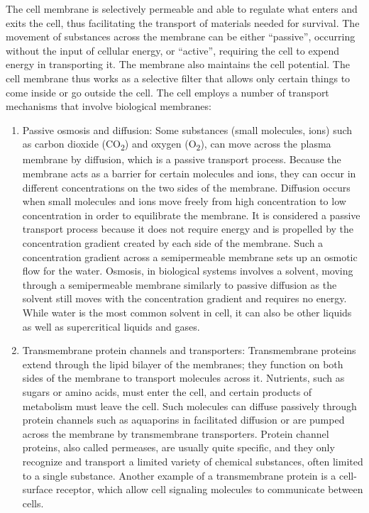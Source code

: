The cell membrane is selectively permeable and able to regulate what enters and exits the cell, thus facilitating the transport of materials needed for survival. The movement of substances across the membrane can be either ``passive'', occurring without the input of cellular energy, or ``active'', requiring the cell to expend energy in transporting it. The membrane also maintains the cell potential. The cell membrane thus works as a selective filter that allows only certain things to come inside or go outside the cell. The cell employs a number of transport mechanisms that involve biological membranes:

\begin{enumerate}
\def\labelenumi{\arabic{enumi}.}
\item
  Passive osmosis and diffusion: Some substances (small molecules, ions) such as carbon dioxide (CO\textsubscript{2}) and oxygen (O\textsubscript{2}), can move across the plasma membrane by diffusion, which is a passive transport process. Because the membrane acts as a barrier for certain molecules and ions, they can occur in different concentrations on the two sides of the membrane. Diffusion occurs when small molecules and ions move freely from high concentration to low concentration in order to equilibrate the membrane. It is considered a passive transport process because it does not require energy and is propelled by the concentration gradient created by each side of the membrane. Such a concentration gradient across a semipermeable membrane sets up an osmotic flow for the water. Osmosis, in biological systems involves a solvent, moving through a semipermeable membrane similarly to passive diffusion as the solvent still moves with the concentration gradient and requires no energy. While water is the most common solvent in cell, it can also be other liquids as well as supercritical liquids and gases.
\item
  Transmembrane protein channels and transporters: Transmembrane proteins extend through the lipid bilayer of the membranes; they function on both sides of the membrane to transport molecules across it. Nutrients, such as sugars or amino acids, must enter the cell, and certain products of metabolism must leave the cell. Such molecules can diffuse passively through protein channels such as aquaporins in facilitated diffusion or are pumped across the membrane by transmembrane transporters. Protein channel proteins, also called permeases, are usually quite specific, and they only recognize and transport a limited variety of chemical substances, often limited to a single substance. Another example of a transmembrane protein is a cell-surface receptor, which allow cell signaling molecules to communicate between cells.

\end{enumerate}
